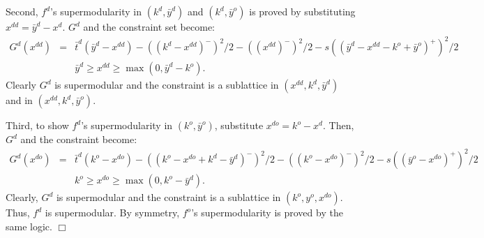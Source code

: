 \documentclass[mnsc,nonblindrev,copyedit]{informs2_wz} %
\newcommand{\qed}{ \hfill $\Box$ }
\begin{document}
Second, $f^d$'s supermodularity in $(k^d,\bar{y}^d)$ and $(k^d,\bar{y}^o)$ is proved by substituting $x^{dd} = \bar{y}^d - x^d$.  $G^d$ and the constraint set become:
\begin{eqnarray*}
G^d(x^{dd}) &=& \bar{t}^d (\bar{y}^d-x^{dd})- ((k^d-x^{dd}
)^-)^2/2 - ((x^{dd})^-)^2/2 - s((\bar{y}^d
-x^{dd}-k^o+\bar{y}^o)^+)^2/2 \\
&& \bar{y}^d \geq x^{dd} \geq \max(0, \bar{y}^d - k^o).
\end{eqnarray*}
Clearly $G^d$ is supermodular and the constraint is a sublattice in $(x^{dd}, k^d, \bar{y}^d)$ and in $(x^{dd}, k^d, \bar{y}^o)$.

Third, to show $f^d$'s supermodularity in $(k^o,\bar{y}^o)$, substitute $x^{do} = k^o - x^d$.  Then, $G^d$ and the constraint become:
\begin{eqnarray*}
G^d(x^{do}) &=& \bar{t}^d (k^o-x^{do})- ((k^o
-x^{do}+k^d-\bar{y}^d )^-)^2/2 - ((k^o-x^{do})^-)^2/2 -
s((\bar{y}^o
-x^{do})^+)^2/2 \\
&& k^o \geq x^{do} \geq \max(0, k^o-\bar{y}^d).
\end{eqnarray*}
Clearly, $G^d$ is supermodular and the constraint is a sublattice in $(k^o, y^o, x^{do})$.  Thus, $f^d$ is supermodular.  By symmetry, $f^o$'s supermodularity is proved by the same logic. \qed

\medskip
\end{document}
